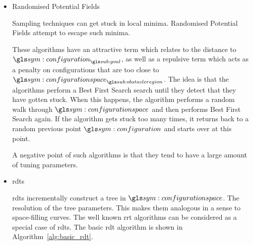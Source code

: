 \begin{itemize}




					\item Randomised Potential Fields

						Sampling techniques can get stuck in local minima.
						Randomised Potential Fields attempt to escape such
						minima.

						These algorithms have an attractive term which relates
						to the distance to $\configuration_{\goal}$, as well as
						a repulsive term which acts as a penalty on
						configurations that are too close to
						$\configurationspace_{\obstacleregion}$. The idea is
						that the algorithms perform a Best First Search search
						until they detect that they have gotten stuck. When this
						happens, the algorithm performs a random walk through
						$\configurationspace$ and  then performs Best First
						Search again. If the algorithm gets stuck too many
						times, it returns back to a random previous point
						$\configuration$ and starts over at this point.

						A negative point of such algorithms is that they tend to
						have a large amount of tuning parameters.

					\item \glspl{rdt}

						\glspl{rdt} incrementally construct a tree in
						$\configurationspace$. The resolution of the tree
						parameters. This makes them analogous in a sense to
						space-filling curves. The well known \gls{rrt}
						algorithms can be considered as a special case of
						\glspl{rdt}. The basic \gls{rdt} algorithm is shown in
						Algorithm~\ref{alg:basic_rdt}.


\end{itemize}
